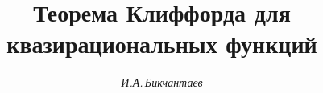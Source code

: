 









\renewcommand{\d}{\mathrm d}


\newcommand{\supp}{\operatorname{supp}}


\newcommand{\ord}{\operatorname{ord}}


\newcommand{\tts}[1]{}







 


\setcounter{page}{9}















\author{\it И.А.\,Бикчантаев}




\title{Теорема Клиффорда для квазирациональных функций}





\date{}




\pagestyle{plain} %







\maketitle


